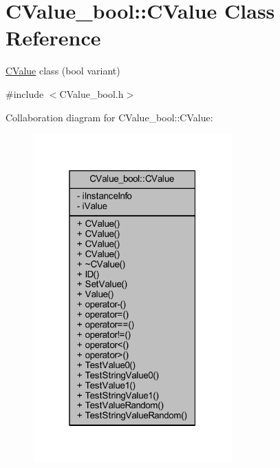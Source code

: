\hypertarget{class_c_value__bool_1_1_c_value}{}\section{C\+Value\+\_\+bool\+:\+:C\+Value Class Reference}
\label{class_c_value__bool_1_1_c_value}


\hyperlink{class_c_value__bool_1_1_c_value}{C\+Value} class ({\ttfamily bool} variant)  




{\ttfamily \#include $<$C\+Value\+\_\+bool.\+h$>$}



Collaboration diagram for C\+Value\+\_\+bool\+:\+:C\+Value\+:\nopagebreak
\begin{figure}[H]
\begin{center}
\leavevmode
\includegraphics[width=217pt]{class_c_value__bool_1_1_c_value__coll__graph}
\end{center}
\end{figure}
